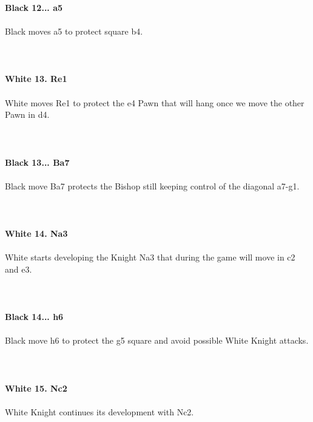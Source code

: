 \documentclass{article}
\begin{document}
\\

\\
\\
\textbf{Black 12... a5}\\
\\
Black moves a5 to protect square b4.\\
\\

\\
\\
\textbf{White 13. Re1}\\
\\
White moves Re1 to protect the e4 Pawn that will hang once we move the other Pawn in d4.\\
\\

\\
\\
\textbf{Black 13... Ba7}\\
\\
Black move Ba7 protects the Bishop still keeping control of the diagonal a7-g1.\\
\\

\\
\\
\textbf{White 14. Na3}\\
\\
White starts developing the Knight Na3 that during the game will move in c2 and e3.\\
\\

\\
\\
\textbf{Black 14... h6}\\
\\
Black move h6 to protect the g5 square and avoid possible White Knight attacks.\\
\\

\\
\\
\textbf{White 15. Nc2}\\
\\
White Knight continues its development with Nc2.\\
\\

\\
\\
\end{document}
